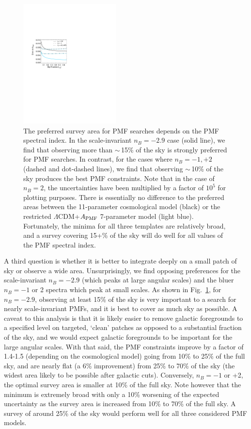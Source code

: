 \documentclass[apj]{emulateapj}
\newcommand{\apmf}{\ensuremath{A_{\rm PMF}}}
\newcommand{\lcdm}{\ensuremath{\Lambda}CDM}
\begin{document}
\begin{figure}[htb]\centering
\includegraphics[width=0.45\textwidth,clip,trim={2.cm 12.5cm 11cm 7.5cm}]{pmf_area.pdf}
  \caption[Area dependence]{
  The preferred survey area for PMF searches depends on the PMF spectral index. 
    In the scale-invariant $n_B = -2.9$ case (solid line), we find that observing more than $\sim$\,15\% of the sky is strongly preferred for PMF searches. 
 In contrast, for the cases where $n_B = -1, +2$ (dashed and dot-dashed lines), we find that observing  $\sim$\,10\% of the sky produces the best PMF constraints. 
   Note that in the case of $n_B=2$, the uncertainties have been multiplied by a factor of $10^5$ for plotting purposes. 
   There is essentially no difference to the preferred areas between the 11-parameter cosmological model (black) or the restricted \lcdm{}+\apmf{} 7-parameter model (light blue). 
     Fortunately, the minima for all three templates are relatively broad, and a survey covering 15+\% of the sky will do well for all values of the PMF spectral index. 
    \label{fig:area}
  }
\end{figure}


A third question is whether it is better to integrate deeply on a small patch of sky or observe a wide area. 
Unsurprisingly, we find opposing preferences for the scale-invariant $n_B=-2.9$ (which peaks at large angular scales) and the bluer $n_B=-1$ or 2 spectra which peak at small scales. 
As shown in  Fig.~\ref{fig:area}, for $n_B=-2.9$, observing at least 15\% of the sky is very important to a search for nearly scale-invariant PMFs, and it is best  to cover as much sky as possible. 
A caveat to this analysis is that it is likely easier to remove galactic foregrounds to a specified level on targeted, `clean' patches as opposed to a substantial fraction of the sky, and we would expect galactic foregrounds to be important for the large angular scales. 
With that said, the PMF constraints improve by a factor of 1.4-1.5 (depending on the cosmological model) going from 10\% to 25\% of the full sky, and are nearly flat (a 6\% improvement) from 25\% to 70\% of the sky (the widest area likely to be possible after galactic cuts).
Conversely, $n_B=-1$ or +2, the optimal survey area is smaller at 10\% of the full sky. 
Note however that the minimum is extremely broad with only a 10\% worsening of the expected uncertainty as the survey area is increased from 10\% to 70\% of the  full sky. 
A survey of around 25\% of the sky would perform well for all three considered PMF models. 
\end{document}

